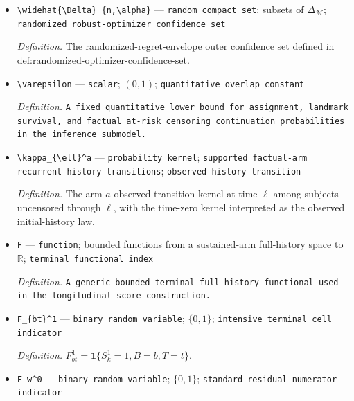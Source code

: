 \documentclass{article}
\begin{document}
\begin{itemize}
  \par\smallskip\noindent\emph{Definition.} The upper envelope of candidate randomized regret over \(\widehat{\mathcal Q}_{n,\alpha}\).
  \item \texttt{\textbackslash{}\allowbreak{}widehat\{\textbackslash{}\allowbreak{}Delta\}\allowbreak{}\_\allowbreak{}\{n,\allowbreak{}\textbackslash{}\allowbreak{}alpha\}\allowbreak{}} --- \texttt{random compact set}; subsets of \(\Delta_{\mathcal M}\); \texttt{randomized robust-\allowbreak{}optimizer confidence set}
  \par\smallskip\noindent\emph{Definition.} The randomized-regret-envelope outer confidence set defined in \(\text{def:randomized-optimizer-confidence-set}\).
  \item \texttt{\textbackslash{}\allowbreak{}varepsilon} --- \texttt{scalar}; \((0,1)\); \texttt{quantitative overlap constant}
  \par\smallskip\noindent\emph{Definition.} \texttt{A fixed quantitative lower bound for assignment,\allowbreak{} landmark survival,\allowbreak{} and factual at-\allowbreak{}risk censoring continuation probabilities in the inference submodel.}
  \item \texttt{\textbackslash{}\allowbreak{}kappa\_\allowbreak{}\{\textbackslash{}\allowbreak{}ell\}\allowbreak{}\textasciicircum{}a} --- \texttt{probability kernel}; \texttt{supported factual-\allowbreak{}arm recurrent-\allowbreak{}history transitions}; \texttt{observed history transition}
  \par\smallskip\noindent\emph{Definition.} The arm-\(a\) observed transition kernel at time \(\ell\) among subjects uncensored through \(\ell\), with the time-zero kernel interpreted as the observed initial-history law.
  \item \texttt{F} --- \texttt{function}; bounded functions from a sustained-arm full-history space to \(\mathbb R\); \texttt{terminal functional index}
  \par\smallskip\noindent\emph{Definition.} \texttt{A generic bounded terminal full-\allowbreak{}history functional used in the longitudinal score construction.}
  \item \texttt{F\_\allowbreak{}\{bt\}\allowbreak{}\textasciicircum{}1} --- \texttt{binary random variable}; \(\{0,1\}\); \texttt{intensive terminal cell indicator}
  \par\smallskip\noindent\emph{Definition.} \(F_{bt}^1=\mathbf 1\{S_k^1=1,B=b,T=t\}\).
  \item \texttt{F\_\allowbreak{}w\textasciicircum{}0} --- \texttt{binary random variable}; \(\{0,1\}\); \texttt{standard residual numerator indicator}

\end{itemize}
\end{document}
